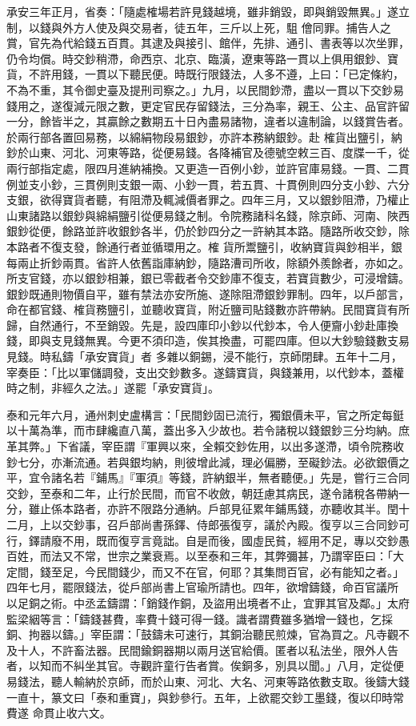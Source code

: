 \begin{pinyinscope}
 承安三年正月，省奏：「隨處榷場若許見錢越境，雖非銷毀，即與銷毀無異。」遂立制，以錢與外方人使及與交易者，徒五年，三斤以上死，駔
 儈同罪。捕告人之賞，官先為代給錢五百貫。其逮及與接引、館伴，先排、通引、書表等以次坐罪，仍令均償。時交鈔稍滯，命西京、北京、臨潢，遼東等路一貫以上俱用銀鈔、寶貨，不許用錢，一貫以下聽民便。時既行限錢法，人多不遵，上曰：「已定條約，不為不重，其令御史臺及提刑司察之。」九月，以民間鈔滯，盡以一貫以下交鈔易錢用之，遂復減元限之數，更定官民存留錢法，三分為率，親王、公主、品官許留一分，餘皆半之，其贏餘之數期五十日內盡易諸物，違者以違制論，以錢賞告者。於兩行部各置回易務，以綿絹物段易銀鈔，亦許本務納銀鈔。赴
 榷貨出鹽引，納鈔於山東、河北、河東等路，從便易錢。各降補官及德號空敕三百、度牒一千，從兩行部指定處，限四月進納補換。又更造一百例小鈔，並許官庫易錢。一貫、二貫例並支小鈔，三貫例則支銀一兩、小鈔一貫，若五貫、十貫例則四分支小鈔、六分支銀，欲得寶貨者聽，有阻滯及輒減價者罪之。四年三月，又以銀鈔阻滯，乃權止山東諸路以銀鈔與綿絹鹽引從便易錢之制。令院務諸科名錢，除京師、河南、陜西銀鈔從便，餘路並許收銀鈔各半，仍於鈔四分之一許納其本路。隨路所收交鈔，除本路者不復支發，餘通行者並循環用之。榷
 貨所鬻鹽引，收納寶貨與鈔相半，銀每兩止折鈔兩貫。省許人依舊詣庫納鈔，隨路漕司所收，除額外羨餘者，亦如之。所支官錢，亦以銀鈔相兼，銀已零截者令交鈔庫不復支，若寶貨數少，可浸增鑄。銀鈔既通則物價自平，雖有禁法亦安所施、遂除阻滯銀鈔罪制。四年，以戶部言，命在都官錢、榷貨務鹽引，並聽收寶貨，附近鹽司貼錢數亦許帶納。民間寶貨有所歸，自然通行，不至銷毀。先是，設四庫印小鈔以代鈔本，令人便齎小鈔赴庫換錢，即與支見錢無異。今更不須印造，俟其換盡，可罷四庫。但以大鈔驗錢數支易見錢。時私鑄「承安寶貨」者
 多雜以銅錫，浸不能行，京師閉肆。五年十二月，宰奏臣：「比以軍儲調發，支出交鈔數多。遂鑄寶貨，與錢兼用，以代鈔本，蓋權時之制，非經久之法。」遂罷「承安寶貨」。



 泰和元年六月，通州刺史盧構言：「民間鈔固已流行，獨銀價未平，官之所定每鋌以十萬為準，而市肆纔直八萬，蓋出多入少故也。若令諸稅以錢銀鈔三分均納。庶革其弊。」下省議，宰臣謂『軍興以來，全賴交鈔佐用，以出多遂滯，頃令院務收鈔七分，亦漸流通。若與銀均納，則彼增此減，理必偏勝，至礙鈔法。必欲銀價之平，宜令諸名若『鋪馬』『軍須』等錢，許納銀半，無者聽便。」先是，嘗行三合同
 交鈔，至泰和二年，止行於民間，而官不收斂，朝廷慮其病民，遂令諸稅各帶納一分，雖止係本路者，亦許不限路分通納。戶部見征累年鋪馬錢，亦聽收其半。閏十二月，上以交鈔事，召戶部尚書孫鐸、侍郎張復亨，議於內殿。復亨以三合同鈔可行，鐸請廢不用，既而復亨言竟詘。自是而後，國虛民貧，經用不足，專以交鈔愚百姓，而法又不常，世宗之業衰焉。以至泰和三年，其弊彌甚，乃謂宰臣曰：「大定間，錢至足，今民間錢少，而又不在官，何耶？其集問百官，必有能知之者。」四年七月，罷限錢法，從戶部尚書上官瑜所請也。四年，欲增鑄錢，命百官議所
 以足銅之術。中丞孟鑄謂：「銷錢作銅，及盜用出境者不止，宜罪其官及鄰。」太府監梁絪等言：「鑄錢甚費，率費十錢可得一錢。識者謂費雖多猶增一錢也，乞採銅、拘器以鑄。」宰臣謂：「鼓鑄未可速行，其銅治聽民煎煉，官為買之。凡寺觀不及十人，不許畜法器。民間鍮銅器期以兩月送官給價。匿者以私法坐，限外人告者，以知而不糾坐其官。寺觀許童行告者賞。俟銅多，別具以聞。」八月，定從便易錢法，聽人輸納於京師，而於山東、河北、大名、河東等路依數支取。後鑄大錢一直十，篆文曰「泰和重寶」，與鈔參行。五年，上欲罷交鈔工墨錢，復以印時常費遂
 命貫止收六文。




\end{pinyinscope}
